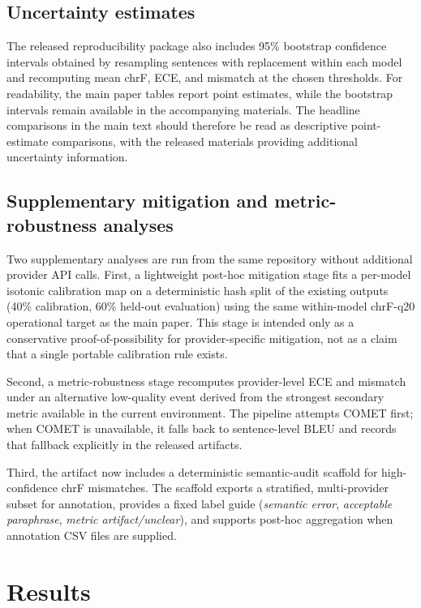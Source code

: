 \documentclass[10pt,conference]{IEEEtran}
\begin{document}
\subsection{Uncertainty estimates}
The released reproducibility package also includes 95\% bootstrap confidence intervals obtained by resampling sentences with replacement within each model and recomputing mean chrF, ECE, and mismatch at the chosen thresholds. For readability, the main paper tables report point estimates, while the bootstrap intervals remain available in the accompanying materials. The headline comparisons in the main text should therefore be read as descriptive point-estimate comparisons, with the released materials providing additional uncertainty information.

\subsection{Supplementary mitigation and metric-robustness analyses}
Two supplementary analyses are run from the same repository without additional provider API calls. First, a lightweight post-hoc mitigation stage fits a per-model isotonic calibration map on a deterministic hash split of the existing outputs (40\% calibration, 60\% held-out evaluation) using the same within-model chrF-q20 operational target as the main paper. This stage is intended only as a conservative proof-of-possibility for provider-specific mitigation, not as a claim that a single portable calibration rule exists.

Second, a metric-robustness stage recomputes provider-level ECE and mismatch under an alternative low-quality event derived from the strongest secondary metric available in the current environment. The pipeline attempts COMET first; when COMET is unavailable, it falls back to sentence-level BLEU and records that fallback explicitly in the released artifacts.

Third, the artifact now includes a deterministic semantic-audit scaffold for high-confidence chrF mismatches. The scaffold exports a stratified, multi-provider subset for annotation, provides a fixed label guide (\emph{semantic error}, \emph{acceptable paraphrase}, \emph{metric artifact/unclear}), and supports post-hoc aggregation when annotation CSV files are supplied.

\section{Results}
\end{document}
